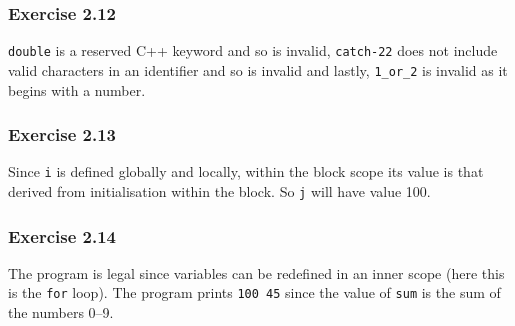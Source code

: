 \documentclass[12pt, a4paper]{article}
\begin{document}
\subsubsection*{Exercise 2.12}
\texttt{double} is a reserved C++ keyword and so is invalid, \texttt{catch-22} does not include valid characters in an identifier and so is invalid and lastly, \texttt{1\_or\_2} is invalid as it begins with a number.

\subsubsection*{Exercise 2.13}
Since \texttt{i} is defined globally and locally, within the block scope its value is that derived from initialisation within the block. So \texttt{j} will have value 100.

\subsubsection*{Exercise 2.14}
The program is legal since variables can be redefined in an inner scope (here this is the \texttt{for} loop). The program prints \texttt{100 45} since the value of \texttt{sum} is the sum of the numbers 0--9.
\end{document}
